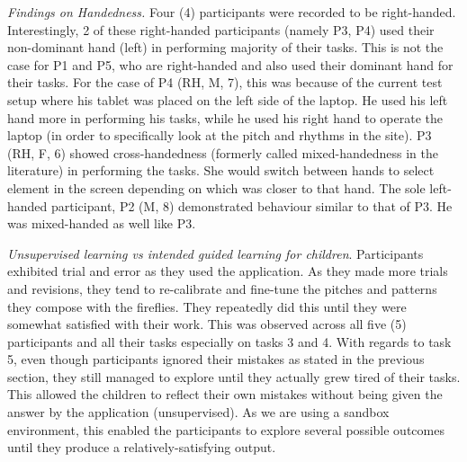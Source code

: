 \textit{Findings on Handedness.} Four (4) participants were recorded to be right-handed. Interestingly, 2 of these right-handed participants (namely P3, P4) used their non-dominant hand (left) in performing majority of their tasks. This is not the case for P1 and P5, who are right-handed and also used their dominant hand for their tasks. For the case of P4 (RH, M, 7), this was because of the current test setup where his tablet was placed on the left side of the laptop. He used his left hand more in performing his tasks, while he used his right hand to operate the laptop (in order to specifically look at the pitch and rhythms in the site). P3 (RH, F, 6) showed cross-handedness (formerly called mixed-handedness in the literature) in performing the tasks. She would switch between hands to select element in the screen depending on which was closer to that hand. The sole left-handed participant, P2 (M, 8) demonstrated behaviour similar to that of P3. He was mixed-handed as well like P3.

\textit{Unsupervised learning vs intended guided learning for children}. Participants exhibited trial and error as they used the application. As they made more trials and revisions, they tend to re-calibrate and fine-tune the pitches and patterns they compose with the fireflies. They repeatedly did this until they were somewhat satisfied with their work. This was observed across all five (5) participants and all their tasks especially on tasks 3 and 4. With regards to task 5, even though participants ignored their mistakes as stated in the previous section, they still managed to explore until they actually grew tired of their tasks. This allowed the children to reflect their own mistakes without being given the answer by the application (unsupervised). As we are using a sandbox environment, this enabled the participants to explore several possible outcomes until they produce a relatively-satisfying output.